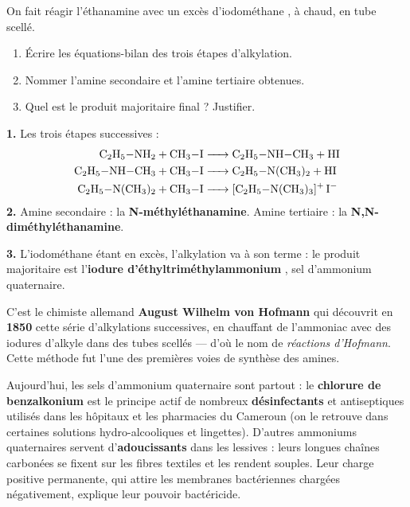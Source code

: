 \documentclass[11pt]{article}
\begin{document}
\begin{exercice}
On fait réagir l'éthanamine  avec un excès d'iodométhane , à chaud, en tube scellé.
\begin{enumerate}
\item Écrire les équations-bilan des trois étapes d'alkylation.
\item Nommer l'amine secondaire et l'amine tertiaire obtenues.
\item Quel est le produit majoritaire final ? Justifier.
\end{enumerate}
\end{exercice}

\begin{corrige}[Exercice 1]
\textbf{1.} Les trois étapes successives :
\begin{align*}
\ce{C2H5-NH2 + CH3-I} &\ce{-> C2H5-NH-CH3 + HI}\\
\ce{C2H5-NH-CH3 + CH3-I} &\ce{-> C2H5-N(CH3)2 + HI}\\
\ce{C2H5-N(CH3)2 + CH3-I} &\ce{-> [C2H5-N(CH3)3]+ I-}
\end{align*}
\textbf{2.} Amine secondaire : la \textbf{N-méthyléthanamine}. Amine tertiaire : la \textbf{N,N-diméthyléthanamine}.

\textbf{3.} L'iodométhane étant en excès, l'alkylation va à son terme : le produit majoritaire est l'\textbf{iodure d'éthyltriméthylammonium} , sel d'ammonium quaternaire.
\end{corrige}

\begin{savaistu}
C'est le chimiste allemand \textbf{August Wilhelm von Hofmann} qui découvrit en \textbf{1850} cette série d'alkylations successives, en chauffant de l'ammoniac avec des iodures d'alkyle dans des tubes scellés — d'où le nom de \emph{réactions d'Hofmann}. Cette méthode fut l'une des premières voies de synthèse des amines.

Aujourd'hui, les sels d'ammonium quaternaire sont partout : le \textbf{chlorure de benzalkonium} est le principe actif de nombreux \textbf{désinfectants} et antiseptiques utilisés dans les hôpitaux et les pharmacies du Cameroun (on le retrouve dans certaines solutions hydro-alcooliques et lingettes). D'autres ammoniums quaternaires servent d'\textbf{adoucissants} dans les lessives : leurs longues chaînes carbonées se fixent sur les fibres textiles et les rendent souples. Leur charge positive permanente, qui attire les membranes bactériennes chargées négativement, explique leur pouvoir bactéricide.
\end{savaistu}
\end{document}
